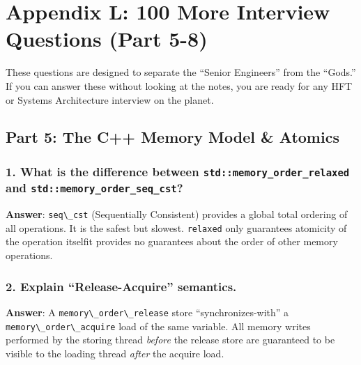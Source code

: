 \hypertarget{appendix-l-100-more-interview-questions-part-5-8}{%
\section{Appendix L: 100 More Interview Questions (Part
5-8)}\label{appendix-l-100-more-interview-questions-part-5-8}}

These questions are designed to separate the ``Senior Engineers'' from
the ``Gods.'' If you can answer these without looking at the notes, you
are ready for any HFT or Systems Architecture interview on the planet.

\hypertarget{part-5-the-c-memory-model-atomics}{%
\subsection{Part 5: The C++ Memory Model \&
Atomics}\label{part-5-the-c-memory-model-atomics}}

\hypertarget{what-is-the-difference-between-stdmemory_order_relaxed-and-stdmemory_order_seq_cst}{%
\subsubsection{\texorpdfstring{1. What is the difference between
\texttt{std::memory\_order\_relaxed} and
\texttt{std::memory\_order\_seq\_cst}?}{1. What is the difference between std::memory\_order\_relaxed and std::memory\_order\_seq\_cst?}}\label{what-is-the-difference-between-stdmemory_order_relaxed-and-stdmemory_order_seq_cst}}

\textbf{Answer}: \passthrough{\lstinline!seq\_cst!} (Sequentially
Consistent) provides a global total ordering of all operations. It is
the safest but slowest. \passthrough{\lstinline!relaxed!} only
guarantees atomicity of the operation itselfit provides no guarantees
about the order of other memory operations.

\hypertarget{explain-release-acquire-semantics.}{%
\subsubsection{2. Explain ``Release-Acquire''
semantics.}\label{explain-release-acquire-semantics.}}

\textbf{Answer}: A \passthrough{\lstinline!memory\_order\_release!}
store ``synchronizes-with'' a
\passthrough{\lstinline!memory\_order\_acquire!} load of the same
variable. All memory writes performed by the storing thread
\emph{before} the release store are guaranteed to be visible to the
loading thread \emph{after} the acquire load.

